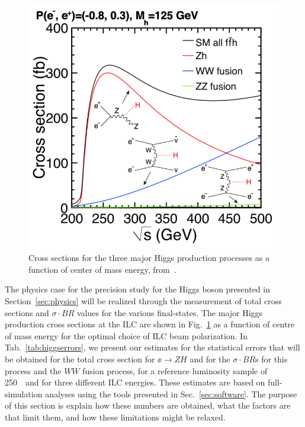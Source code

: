 





\begin{figure}
\begin{center}
\includegraphics[width=0.85\hsize]{chapters/figures/xsec_h_ILC_left.pdf}
\end{center}
\caption{Cross sections for the three major Higgs production processes
  as a function of 
center of mass energy, 
from~\cite{Baer:2013cma}.}
\label{fig:HiggsProdILC}
\end{figure}


The physics case for the precision study for the Higgs
boson
presented  in Section~\ref{sec:physics}
will be realized through the measurement of  total cross sections and 
$\sigma\cdot BR$  values for the various final-states.  The major
Higgs production cross sections at the ILC are shown in
Fig.~\ref{fig:HiggsProdILC} as a function of centre of mass energy for
the optimal choice of  ILC beam polarization.    In
Tab.~\ref{tab:higgserrors},  we present our estimates for the
statistical errors that will be obtained for the total cross section for $\ee\to ZH$ and for
the $\sigma\cdot BR$s for  this process and the $WW$ fusion process, 
for a reference luminosity sample of 
250~\ifb\ and for three different ILC energies.  These estimates are
based on full-simulation analyses using the tools presented in
Sec.~\ref{sec:software}.     The purpose of this
section is explain how these numbers are obtained, what the factors
are  that limit them, and how these limitations might be relaxed.


